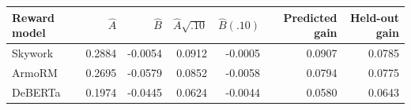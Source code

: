 \begin{tabular}{lrrrrrr}
\toprule
Reward model & $\widehat A$ & $\widehat B$ & $\widehat A\sqrt{.10}$ & $\widehat B(.10)$ & Predicted gain & Held-out gain \\
\midrule
Skywork & 0.2884 & -0.0054 & 0.0912 & -0.0005 & 0.0907 & 0.0785 \\
ArmoRM & 0.2695 & -0.0579 & 0.0852 & -0.0058 & 0.0794 & 0.0775 \\
DeBERTa & 0.1974 & -0.0445 & 0.0624 & -0.0044 & 0.0580 & 0.0643 \\
\bottomrule
\end{tabular}
